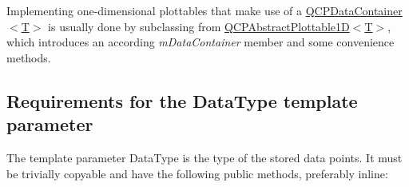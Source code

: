 Implementing one-\/dimensional plottables that make use of a \hyperlink{classQCPDataContainer}{Q\+C\+P\+Data\+Container$<$\+T$>$} is usually done by subclassing from \hyperlink{classQCPAbstractPlottable1D}{Q\+C\+P\+Abstract\+Plottable1D$<$T$>$}, which introduces an according {\itshape m\+Data\+Container} member and some convenience methods.\hypertarget{classQCPDataContainer_qcpdatacontainer-datatype}{}\subsection{Requirements for the Data\+Type template parameter}\label{classQCPDataContainer_qcpdatacontainer-datatype}
The template parameter {\ttfamily Data\+Type} is the type of the stored data points. It must be trivially copyable and have the following public methods, preferably inline\+:

